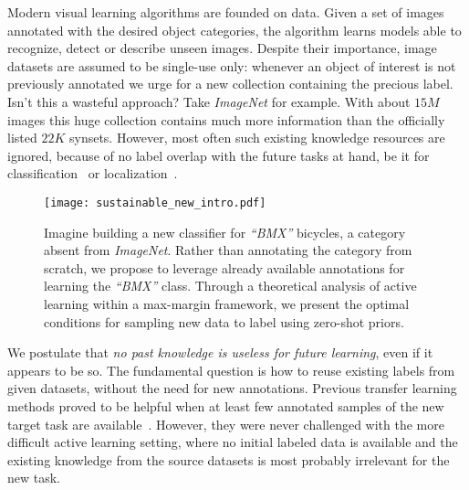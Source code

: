 \documentclass[10pt,twocolumn,letterpaper]{article}
\begin{document}
Modern visual learning algorithms are founded on data. Given a set of images annotated with the desired object categories, the algorithm learns models able to recognize, detect or describe unseen images. Despite their importance, image datasets are assumed to be single-use only: whenever an object of interest is not previously annotated we urge for a new collection containing the precious label. Isn't this a wasteful approach? Take \emph{ImageNet}\cite{imagenet_cvpr09} for example. With about $15M$ images this huge collection contains much more information than the officially listed $22K$ synsets. 
However, most often such existing knowledge resources are ignored, because of no label overlap with the future tasks at hand, be it for classification~\cite{Freytag14, KovashkaVG11, Tommasi_BMVC_2012} or localization~\cite{VijayanarasimhanJG10, VezhnevetsBF12, LiECCV2014}.

\begin{figure}[t!]
    \centering
    \texttt{[image: sustainable\_new\_intro.pdf]}
    \caption{Imagine building a new classifier for \emph{``BMX''} bicycles, a category absent from \emph{ImageNet}. Rather than annotating the category from scratch, we propose to leverage already available annotations for learning the \emph{``BMX''} class. Through a theoretical analysis of active learning within a max-margin framework, we present the optimal conditions for sampling new data to label using zero-shot priors. \vspace{-5mm}}
\label{fig:intro}
\end{figure}%

We postulate that \emph{no past knowledge is useless for future learning}, even if it appears to be so.
The fundamental question is how to reuse existing labels from given datasets, without the need for new annotations.
Previous transfer learning methods proved to be helpful when at least few annotated samples of the new target task are available~\cite{Pan_survey}. However, they were never challenged with the more difficult active learning setting, where no initial labeled data is available and the existing knowledge from the source datasets is most probably irrelevant for the new task.
\end{document}

